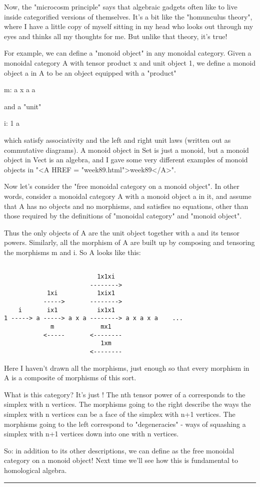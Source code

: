 Now, the "microcosm principle" says that algebraic gadgets often like to
live inside categorified versions of themselves.  It's a bit like the
"homunculus theory", where I have a little copy of myself sitting in my
head who looks out through my eyes and thinks all my thoughts for me.
But unlike that theory, it's true!

For example, we can define a "monoid object" in any monoidal category.
Given a monoidal category A with tensor product x and unit object 1, we
define a monoid object a in A to be an object equipped with a "product"

m: a x a \to  a

and a "unit"

i: 1 \to  a

which satisfy associativity and the left and right unit laws (written
out as commutative diagrams).  A monoid object in Set is just a monoid,
but a monoid object in Vect is an algebra, and I gave some very
different examples of monoid objects in "<A HREF = "week89.html">week89</A>".

Now let's consider the "free monoidal category on a monoid object".  In
other words, consider a monoidal category A with a monoid object a in
it, and assume that A has no objects and no morphisms, and satisfies no
equations, other than those required by the definitions of "monoidal
category" and "monoid object".

Thus the only objects of A are the unit object together with a and its
tensor powers.  Similarly, all the morphism of A are built up by
composing and tensoring the morphisms m and i.  So A looks like this:


\begin{verbatim}

                          1x1xi
                        -------->
            1xi           1xix1
           ----->       -------->
    i       ix1           ix1x1
1 -----> a -----> a x a --------> a x a x a    ...
             m             mx1
           <-----       <--------
                           1xm
                        <--------
\end{verbatim}
    
Here I haven't drawn all the morphisms, just enough so that every
morphism in A is a composite of morphisms of this sort.  

What is this category?  It's just \Delta !  The nth tensor power of a
corresponds to the simplex with n vertices.  The morphisms going to
the right describe the ways the simplex with n vertices can be a face
of the simplex with n+1 vertices.  The morphisms going to the left
correspond to "degeneracies" - ways of squashing a simplex
with n+1 vertices down into one with n vertices.

So: in addition to its other descriptions, we can define \Delta  as the
free monoidal category on a monoid object!  Next time we'll see how
this is fundamental to homological algebra.






 \par\noindent\rule{\textwidth}{0.4pt}

